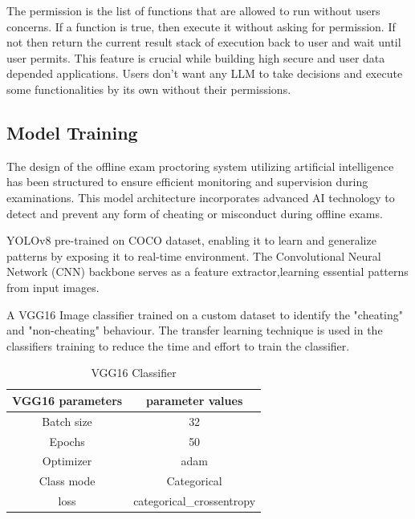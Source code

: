 \documentclass[conference]{IEEEtran}
\begin{document}
The permission is the list of functions that are allowed to run without users concerns. If a function is true, then execute it without asking for permission. If not then return the current result stack of execution back to user and wait until user permits. This feature is crucial while building high secure and user data depended applications. Users don't want any LLM to take decisions and execute some functionalities by its own without their permissions.


\subsection{Model Training}
The design of the offline exam proctoring system utilizing artificial intelligence has been structured to ensure efficient monitoring and supervision during examinations. This model architecture incorporates advanced AI technology to detect and prevent any form of cheating or misconduct during offline exams.

YOLOv8 pre-trained on COCO dataset, enabling it to learn and generalize patterns by exposing it to real-time environment. The Convolutional Neural Network (CNN) backbone serves as a feature extractor,learning essential patterns from input images.

A VGG16 Image classifier trained on a custom dataset to identify the "cheating" and "non-cheating" behaviour. The transfer learning technique is used in the classifiers training to reduce the time and effort to train the classifier.
\begin{table}[htbp]
\caption{VGG16 Classifier}
\label{tab2} %
\begin{center}
\begin{tabular}{|c|c|}
\hline
\textbf{VGG16 parameters} & \textbf{parameter values} \\ %
\hline
Batch size & 32 \\ %
\hline
Epochs& 50 \\
\hline
Optimizer& adam\\
\hline
Class mode& Categorical\\
\hline
loss & categorical\_crossentropy \\

\hline
\end{tabular}
\end{center}
\end{table}
\end{document}
